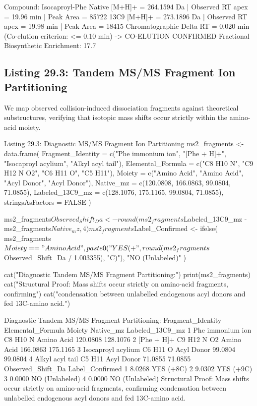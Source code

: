 \documentclass[11pt,twoside,openright]{book}
\begin{document}
\begin{routput}
Compound: Isocaproyl-Phe
  Native   [M+H]+ = 264.1594 Da | Observed RT apex = 19.96 min | Peak Area = 85722
  13C9     [M+H]+ = 273.1896 Da | Observed RT apex = 19.98 min | Peak Area = 18415
  Chromatographic Delta RT = 0.020 min (Co-elution criterion: <= 0.10 min) -> CO-ELUTION CONFIRMED
  Fractional Biosynthetic Enrichment: 17.7%
\end{routput}

\subsection{Listing 29.3: Tandem MS/MS Fragment Ion Partitioning}

We map observed collision-induced dissociation fragments against theoretical substructures, verifying that isotopic mass shifts occur strictly within the amino-acid moiety.

\begin{rchunk}{Listing 29.3: Diagnostic MS/MS Fragment Ion Partitioning}
ms2_fragments <- data.frame(
  Fragment_Identity  = c("Phe immonium ion", "[Phe + H]+", "Isocaproyl acylium", "Alkyl acyl tail"),
  Elemental_Formula  = c("C8 H10 N", "C9 H12 N O2", "C6 H11 O", "C5 H11"),
  Moiety             = c("Amino Acid", "Amino Acid", "Acyl Donor", "Acyl Donor"),
  Native_mz          = c(120.0808, 166.0863, 99.0804, 71.0855),
  Labeled_13C9_mz    = c(128.1076, 175.1165, 99.0804, 71.0855),
  stringsAsFactors   = FALSE
)

ms2_fragments$Observed_Shift_Da <- round(ms2_fragments$Labeled_13C9_mz - ms2_fragments$Native_mz, 4)
ms2_fragments$Label_Confirmed <- ifelse(
  ms2_fragments$Moiety == "Amino Acid",
  paste0("YES (+", round(ms2_fragments$Observed_Shift_Da / 1.003355), "C)"),
  "NO (Unlabeled)"
)

cat("Diagnostic Tandem MS/MS Fragment Partitioning:\n")
print(ms2_fragments)
cat("Structural Proof: Mass shifts occur strictly on amino-acid fragments, confirming\n")
cat("condensation between unlabelled endogenous acyl donors and fed 13C-amino acid.\n")
\end{rchunk}

\begin{routput}
Diagnostic Tandem MS/MS Fragment Partitioning:
   Fragment\_Identity Elemental\_Formula     Moiety Native\_mz Labeled\_13C9\_mz
1   Phe immonium ion          C8 H10 N Amino Acid  120.0808        128.1076
2         [Phe + H]+       C9 H12 N O2 Amino Acid  166.0863        175.1165
3 Isocaproyl acylium          C6 H11 O Acyl Donor   99.0804         99.0804
4    Alkyl acyl tail            C5 H11 Acyl Donor   71.0855         71.0855
  Observed\_Shift\_Da Label\_Confirmed
1            8.0268       YES (+8C)
2            9.0302       YES (+9C)
3            0.0000  NO (Unlabeled)
4            0.0000  NO (Unlabeled)
Structural Proof: Mass shifts occur strictly on amino-acid fragments, confirming
condensation between unlabelled endogenous acyl donors and fed 13C-amino acid.
\end{routput}
\end{document}
